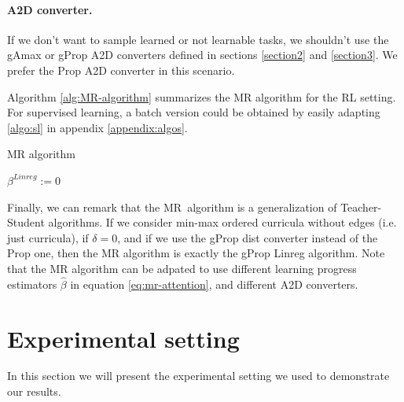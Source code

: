 \documentclass{article}
\begin{document}
\paragraph{A2D converter.} If we don't want to sample learned or not learnable tasks, we shouldn't use the gAmax or gProp A2D converters defined in sections \ref{section2} and \ref{section3}. We prefer the Prop A2D converter in this scenario.

Algorithm \ref{alg:MR-algorithm} summarizes the MR algorithm for the RL setting. For supervised learning, a batch version could be obtained by easily adapting \ref{algo:sl} in appendix \ref{appendix:algos}.

\begin{center}
\begin{algorithm}[H]
\label{alg:MR-algorithm}
\caption{MR algorithm}


$\beta^{Linreg} := 0$ \;
\end{algorithm}
\end{center}

Finally, we can remark that the MR\ algorithm is a generalization of Teacher-Student algorithms. If we consider min-max ordered curricula without edges (i.e. just curricula),  if \(\delta=0\), and if we use the gProp dist converter instead of the Prop one, then the MR algorithm is exactly the gProp Linreg algorithm. Note that the MR algorithm can be adpated to use different learning progress estimators $\hat{\beta}$ in equation \ref{eq:mr-attention}, and different A2D converters.

\section{Experimental setting}
\label{section5}
In this section we will present the experimental setting we used to demonstrate our results. 
\end{document}
